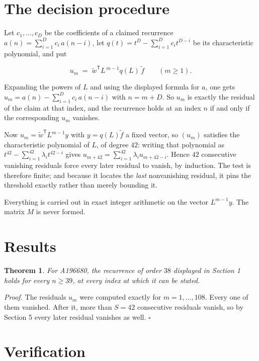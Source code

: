 \documentclass[11pt]{article}
\newtheorem{theorem}{Theorem}
\theoremstyle{definition}
\begin{document}
\section{The decision procedure}

Let $c_1,\dots,c_D$ be the coefficients of a claimed recurrence $a(n) = \sum_{i=1}^{D} c_i\,a(n-i)$, let $q(t) = t^{D} - \sum_{i=1}^{D} c_i t^{D-i}$ be its characteristic polynomial, and put

\[u_m \;=\; \tilde w^{\mathsf T} L^{\,m-1} q(L)\,\tilde f \qquad (m \ge 1).\]

Expanding the powers of $L$ and using the displayed formula for $a$, one gets $u_m = a(n) - \sum_{i=1}^{D} c_i\,a(n-i)$ with $n = m + D$. So $u_m$ is exactly the residual of the claim at that index, and the recurrence holds at an index $n$ if and only if the corresponding $u_m$ vanishes.

Now $u_m = \tilde w^{\mathsf T} L^{m-1} y$ with $y = q(L)\tilde f$ a fixed vector, so $(u_m)$ satisfies the characteristic polynomial of $L$, of degree $42$: writing that polynomial as $t^{42} - \sum_{i=1}^{42} \lambda_i t^{42-i}$ gives $u_{m+42} = \sum_{i=1}^{42} \lambda_i u_{m+42-i}$. Hence $42$ consecutive vanishing residuals force every later residual to vanish, by induction. The test is therefore finite; and because it locates the {\itshape last} nonvanishing residual, it pins the threshold exactly rather than merely bounding it.

Everything is carried out in exact integer arithmetic on the vector $L^{m-1}y$. The matrix $M$ is never formed.

\section{Results}

\begin{theorem} For A196680, the recurrence of order $38$ displayed in Section 1 holds for every $n \ge 39$, at every index at which it can be stated.\end{theorem}

{\itshape Proof.} The residuals $u_m$ were computed exactly for $m = 1,\dots,108$. Every one of them vanished. After it, more than $S = 42$ consecutive residuals vanish, so by Section 5 every later residual vanishes as well. $\square$

\section{Verification}
\end{document}

